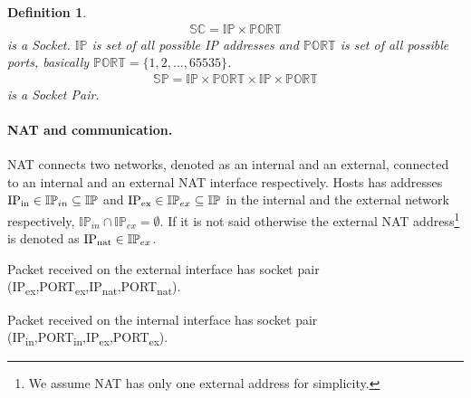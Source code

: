 \documentclass[twoside]{article}
\newtheorem{mydef}{Definition}
\begin{document}
\begin{multicols}{2}
\begin{mydef}
\begin{align*}
\mathbb{SC} = \mathbb{IP} \times \mathbb{PORT}
\end{align*} is a Socket. $\mathbb{IP}$ is set of all possible IP addresses and $\mathbb{PORT}$ 
is set of all possible ports, basically $\mathbb{PORT} = \{1,2,\dots,65535\}$.
\begin{align*}
\mathbb{SP} = \mathbb{IP} \times \mathbb{PORT} \times \mathbb{IP} \times \mathbb{PORT}
\end{align*} is a Socket Pair.
\end{mydef}
% 

\paragraph{NAT and communication.}
NAT connects two networks, denoted as an internal and an external, connected to an internal and an external NAT interface respectively.
Hosts has addresses $\text{IP\textsubscript{in}} \in \mathbb{IP}_{in} \subseteq \mathbb{IP}$ 
and $\text{IP\textsubscript{ex}} \in \mathbb{IP}_{ex} \subseteq \mathbb{IP}$ in the internal and the external network
respectively, $\mathbb{IP}_{in} \cap \mathbb{IP}_{ex} = \emptyset$.
If it is not said otherwise the external NAT address\footnote{We assume NAT has only one external address for simplicity.} is denoted as 
$\text{IP\textsubscript{nat}} \in \mathbb{IP}_{ex}$.

Packet received on the external interface has socket pair {(IP\textsubscript{ex},PORT\textsubscript{ex},IP\textsubscript{nat},PORT\textsubscript{nat})}.

Packet received on the internal interface has socket pair {(IP\textsubscript{in},PORT\textsubscript{in},IP\textsubscript{ex},PORT\textsubscript{ex})}.


\end{multicols}
\end{document}
